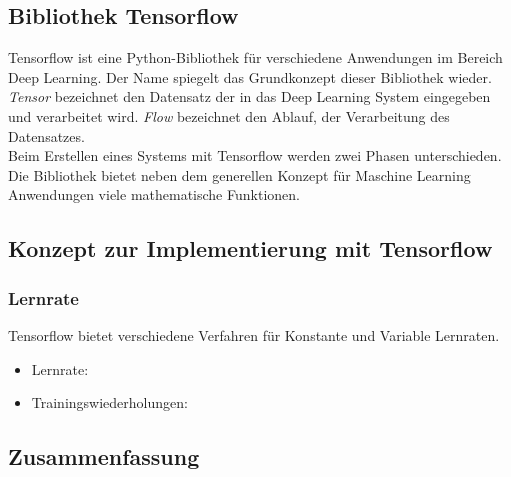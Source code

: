 \subsection{Bibliothek Tensorflow}
Tensorflow ist eine Python-Bibliothek für verschiedene Anwendungen im Bereich Deep Learning. 
Der Name spiegelt das Grundkonzept dieser Bibliothek wieder. 
\textit{Tensor} bezeichnet den Datensatz der in das Deep Learning System 
eingegeben und verarbeitet wird. \textit{Flow} bezeichnet den Ablauf, 
der Verarbeitung des Datensatzes. \\
Beim Erstellen eines Systems mit Tensorflow werden zwei Phasen 
unterschieden. 
Die Bibliothek bietet neben dem generellen Konzept für Maschine Learning Anwendungen 
viele mathematische Funktionen. 
\cite{tf:2018}

\subsection{Konzept zur Implementierung mit Tensorflow}
\subsubsection{Lernrate}
Tensorflow bietet verschiedene Verfahren für Konstante und Variable Lernraten. 


\begin{itemize}
    \item Lernrate: 
    \item Trainingswiederholungen:
\end{itemize}




\subsection{Zusammenfassung}
